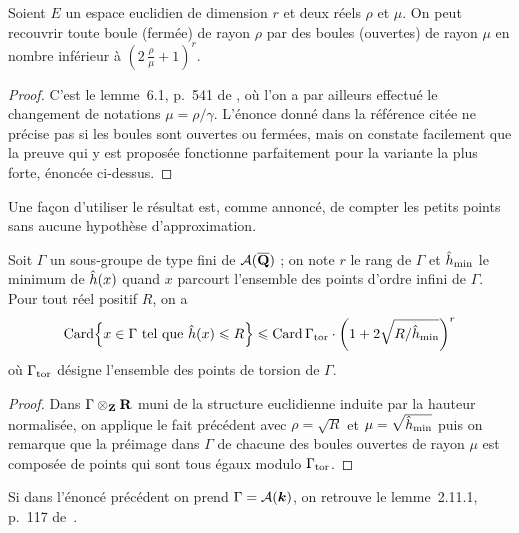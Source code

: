 \begin{fact}
  Soient \( E \) un espace euclidien de dimension \( r \) et deux réels \(
    \rho \) et \( \mu \). On peut recouvrir toute boule (fermée) de rayon \(
    \rho \) par des boules (ouvertes) de rayon \( \mu \) en nombre inférieur à
  \( ( 2 \, \frac\rho\mu + 1 )^r \).
\end{fact}

\begin{proof}
  C'est le lemme~6.1, p.~541 de \cite{remdcl}, où l'on a par ailleurs effectué
  le changement de notations \( \mu = \rho / \gamma \).  L'énonce donné dans
  la référence citée ne précise pas si les boules sont ouvertes ou fermées,
  mais on constate facilement que la preuve qui y est proposée fonctionne
  parfaitement pour la variante la plus forte, énoncée ci-dessus.
\end{proof}

Une façon d'utiliser le résultat est, comme annoncé, de compter les petits
points sans aucune hypothèse d'approximation.

\begin{coro} \label{c:small-va}
  Soit \( \Gamma \) un sous-groupe de type fini de \( \mathcal A(\overline{{\mathbf{Q}}}) \) ; on note
  \( r \) le rang de \( \Gamma \) et \( \hat h_{\mathrm{min}} \) le minimum de \( \hat h (x) \)
  quand \( x \) parcourt l'ensemble des points d'ordre infini de \( \Gamma \).
  Pour tout réel positif \( R \), on a
  \begin{equation}
    \card \set*{
      x \in \Gamma
      \text{ tel que }
      \hautn x \le R
    }
    \le
    \card \Gamma_\torsion
    \cdot
    \left( 1 + 2\sqrt{R / \hmin} \right)^r
  \end{equation}
  où \( \Gamma_{\mathrm{tor}} \) désigne l'ensemble des points de torsion de \(
    \Gamma \).
\end{coro}

\begin{proof}
  Dans \( \Gamma \otimes_{\mathbf{Z}} {\mathbf{R}} \) muni de la structure euclidienne induite par
  la hauteur normalisée, on applique le fait précédent avec \( \rho = \sqrt R
  \) et \( \mu = \sqrt{\hat h_{\mathrm{min}}} \) puis on remarque que la préimage dans \(
    \Gamma \) de chacune des boules ouvertes de rayon \( \mu \) est composée
  de points qui sont tous égaux modulo \( \Gamma_{\mathrm{tor}} \).
\end{proof}

\begin{rem}
  Si dans l'énoncé précédent on prend \( \Gamma = \mathcal A({\boldsymbol k}) \), on retrouve le
  lemme~2.11.1, p.~117 de~\cite{farhith}.
\end{rem}

